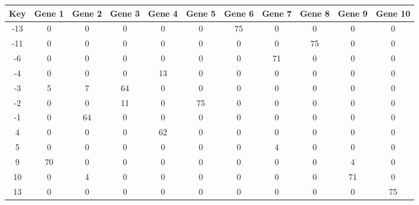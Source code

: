 \begin{tabular}{|c|c|c|c|c|c|c|c|c|c|c|}
\hline
Key & Gene 1 & Gene 2 & Gene 3 & Gene 4 & Gene 5 & Gene 6 & Gene 7 & Gene 8 & Gene 9 & Gene 10 \\
\hline
-13 & 0 & 0 & 0 & 0 & 0 & 75 & 0 & 0 & 0 & 0 \\
-11 & 0 & 0 & 0 & 0 & 0 & 0 & 0 & 75 & 0 & 0 \\
-6 & 0 & 0 & 0 & 0 & 0 & 0 & 71 & 0 & 0 & 0 \\
-4 & 0 & 0 & 0 & 13 & 0 & 0 & 0 & 0 & 0 & 0 \\
-3 & 5 & 7 & 64 & 0 & 0 & 0 & 0 & 0 & 0 & 0 \\
-2 & 0 & 0 & 11 & 0 & 75 & 0 & 0 & 0 & 0 & 0 \\
-1 & 0 & 64 & 0 & 0 & 0 & 0 & 0 & 0 & 0 & 0 \\
4 & 0 & 0 & 0 & 62 & 0 & 0 & 0 & 0 & 0 & 0 \\
5 & 0 & 0 & 0 & 0 & 0 & 0 & 4 & 0 & 0 & 0 \\
9 & 70 & 0 & 0 & 0 & 0 & 0 & 0 & 0 & 4 & 0 \\
10 & 0 & 4 & 0 & 0 & 0 & 0 & 0 & 0 & 71 & 0 \\
13 & 0 & 0 & 0 & 0 & 0 & 0 & 0 & 0 & 0 & 75 \\
\hline
\end{tabular}